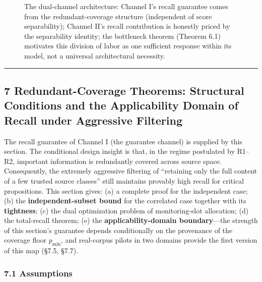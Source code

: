 \documentclass[
  11pt]{article}
\begin{document}
\begin{figure}[h]
{}
\caption{The dual-channel architecture: Channel I's recall guarantee comes from the redundant-coverage structure (independent of score separability); Channel II's recall contribution is honestly priced by the separability identity; the bottleneck theorem (Theorem 6.1) motivates this division of labor as one sufficient response within its model, not a universal architectural necessity.}
\end{figure}

\begin{center}\rule{0.5\linewidth}{0.5pt}\end{center}

\subsection{7 Redundant-Coverage Theorems: Structural Conditions and the
Applicability Domain of Recall under Aggressive
Filtering}\label{redundant-coverage-theorems-structural-conditions-and-the-applicability-domain-of-recall-under-aggressive-filtering}

The recall guarantee of Channel I (the guarantee channel) is supplied by
this section. The conditional design insight is that, in the regime
postulated by R1--R2, important information is redundantly covered
across source space. Consequently, the extremely aggressive filtering of
``retaining only the full content of a few trusted source classes''
still maintains provably high recall for critical propositions. This
section gives: (a) a complete proof for the independent case; (b) the
\textbf{independent-subset bound} for the correlated case together with
its \textbf{tightness}; (c) the dual optimization problem of
monitoring-slot allocation; (d) the total-recall theorem; (e) the
\textbf{applicability-domain boundary}---the strength of this section's
guarantee depends conditionally on the provenance of the coverage floor
\(p_{\min}\), and real-corpus pilots in two domains provide the first
version of this map (§7.5, §7.7).

\subsubsection{7.1 Assumptions}\label{assumptions}
\end{document}
